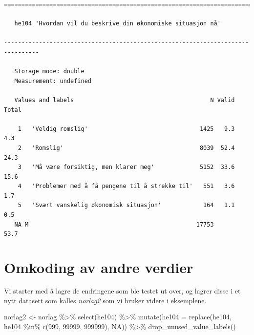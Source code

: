 \documentclass[
  letterpaper,
  DIV=11,
  numbers=noendperiod]{scrreprt}
\newenvironment{Shaded}{\begin{snugshade}}{\end{snugshade}}
\newcommand{\AttributeTok}[1]{\textcolor[rgb]{0.40,0.45,0.13}{#1}}
\newcommand{\ConstantTok}[1]{\textcolor[rgb]{0.56,0.35,0.01}{#1}}
\newcommand{\DecValTok}[1]{\textcolor[rgb]{0.68,0.00,0.00}{#1}}
\newcommand{\FunctionTok}[1]{\textcolor[rgb]{0.28,0.35,0.67}{#1}}
\newcommand{\NormalTok}[1]{\textcolor[rgb]{0.00,0.23,0.31}{#1}}
\newcommand{\OtherTok}[1]{\textcolor[rgb]{0.00,0.23,0.31}{#1}}
\newcommand{\SpecialCharTok}[1]{\textcolor[rgb]{0.37,0.37,0.37}{#1}}
\begin{document}
\begin{verbatim}
================================================================================

   he104 'Hvordan vil du beskrive din økonomiske situasjon nå'

--------------------------------------------------------------------------------

   Storage mode: double
   Measurement: undefined

   Values and labels                                       N Valid Total
                                                                        
    1   'Veldig romslig'                                1425   9.3   4.3
    2   'Romslig'                                       8039  52.4  24.3
    3   'Må være forsiktig, men klarer meg'             5152  33.6  15.6
    4   'Problemer med å få pengene til å strekke til'   551   3.6   1.7
    5   'Svært vanskelig økonomisk situasjon'            164   1.1   0.5
   NA M                                                17753        53.7
\end{verbatim}

\hypertarget{omkoding-av-andre-verdier}{%
\section{Omkoding av andre verdier}\label{omkoding-av-andre-verdier}}

Vi starter med å lagre de endringene som ble testet ut over, og lagrer
disse i et nytt datasett som kalles \emph{norlag2} som vi bruker videre
i eksemplene.

\begin{Shaded}
\begin{Highlighting}[]
\NormalTok{norlag2 }\OtherTok{\textless{}{-}}\NormalTok{ norlag }\SpecialCharTok{\%\textgreater{}\%} 
  \FunctionTok{select}\NormalTok{(he104) }\SpecialCharTok{\%\textgreater{}\%} 
  \FunctionTok{mutate}\NormalTok{(}\AttributeTok{he104 =} \FunctionTok{replace}\NormalTok{(he104, }
\NormalTok{                         he104 }\SpecialCharTok{\%in\%} \FunctionTok{c}\NormalTok{(}\DecValTok{999}\NormalTok{, }\DecValTok{99999}\NormalTok{, }\DecValTok{999999}\NormalTok{), }
                         \ConstantTok{NA}\NormalTok{)) }\SpecialCharTok{\%\textgreater{}\%}  
  \FunctionTok{drop\_unused\_value\_labels}\NormalTok{() }
\end{Highlighting}
\end{Shaded}
\end{document}
